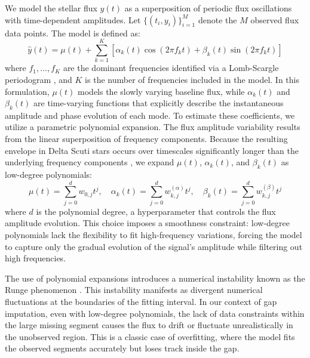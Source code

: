 \documentclass[a4paper,fleqn]{cas-sc}
\begin{document}
We model the stellar flux $\hat{y}(t)$ as a superposition of periodic flux oscillations with time-dependent amplitudes. Let $\{(t_i, y_i)\}_{i=1}^{M}$ denote the $M$ observed flux data points. The model is defined as:
\begin{equation} \label{eq:model}
    \hat{y}(t) = \mu(t) + \sum_{k=1}^{K} \left[ \alpha_k(t) \cos(2\pi f_k t) + \beta_k(t) \sin(2\pi f_k t) \right]
\end{equation}
where $f_1, \ldots, f_K$ are the dominant frequencies identified via a Lomb-Scargle periodogram \cite{vanderplas2018understanding}, and $K$ is the number of frequencies included in the model. In this formulation, $\mu(t)$ models the slowly varying baseline flux, while $\alpha_k(t)$ and $\beta_k(t)$ are time-varying functions that explicitly describe the instantaneous amplitude and phase evolution of each mode. To estimate these coefficients, we utilize a parametric polynomial expansion. The flux amplitude variability results from the linear superposition of frequency components. Because the resulting envelope in Delta Scuti stars occurs over timescales significantly longer than the underlying frequency components \cite{ortega2025asteroseismology}, we expand $\mu(t)$, $\alpha_k(t)$, and $\beta_k(t)$ as low-degree polynomials:
\begin{equation}
    \mu(t) = \sum_{j=0}^{d} w_{0,j} t^j, \quad \alpha_k(t) = \sum_{j=0}^{d} w_{k,j}^{(\alpha)} t^j, \quad \beta_k(t) = \sum_{j=0}^{d} w_{k,j}^{(\beta)} t^j
\end{equation}
where $d$ is the polynomial degree, a hyperparameter that controls the flux amplitude evolution. This choice imposes a smoothness constraint: low-degree polynomials lack the flexibility to fit high-frequency variations, forcing the model to capture only the gradual evolution of the signal's amplitude while filtering out high frequencies. %



The use of polynomial expansions introduces a numerical instability known as the Runge phenomenon \cite{trefethen2019approximation, cosgun2022exploring}. This instability manifests as divergent numerical fluctuations at the boundaries of the fitting interval. In our context of gap imputation, even with low-degree polynomials, the lack of data constraints within the large missing segment causes the flux to drift or fluctuate unrealistically in the unobserved region. This is a classic case of overfitting, where the model fits the observed segments accurately but loses track inside the gap.
\end{document}
